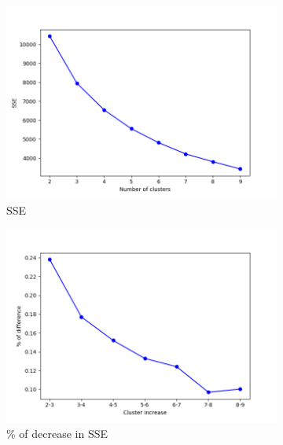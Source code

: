 \begin{figure}[h!]
     \captionsetup{justification=centering}		
     \centering
     \begin{subfigure}{0.32\textwidth}
         \centering
         \includegraphics[width=\textwidth]{img/clustering/sse.png}
         \caption{SSE}
         \label{fig:sse_img}
     \end{subfigure}
     \begin{subfigure}{0.32\textwidth}
         \centering
         \includegraphics[width=\textwidth]{img/clustering/perc.png}
         \caption{\% of decrease in SSE}
         \label{fig:pdiff_img}
     \end{subfigure}
     \begin{subfigure}{0.32\textwidth}
         \centering

\end{subfigure}
\end{figure}
